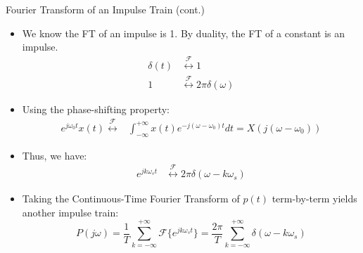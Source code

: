 \begin{frame}{Fourier Transform of an Impulse Train (cont.)}
  \vspace{-0.2cm}
  \begin{itemize}
      [bullet]

    \item We know the FT of an impulse is 1. By duality, the FT of a constant is an impulse.
      \begin{align*}
        \delta(t) & \stackrel{\mathcal{F}}{\longleftrightarrow} 1                  \\
        1         & \stackrel{\mathcal{F}}{\longleftrightarrow} 2\pi\delta(\omega)
      \end{align*}

    \item Using the phase-shifting property:
      \begin{align*}
        e^{j\omega_0 t} x(t)  \stackrel{\mathcal{F}}{\longleftrightarrow}
        & \int_{-\infty}^{+\infty} x(t) e^{-j(\omega - \omega_0)t} dt = X(j(\omega - \omega_0))
      \end{align*}
    \item Thus, we have:
      \begin{align*}
        e^{jk\omega_s t} & \stackrel{\mathcal{F}}{\longleftrightarrow} 2\pi\delta(\omega - k\omega_s)
      \end{align*}
    \item Taking the Continuous-Time Fourier Transform of $p(t)$ term-by-term yields another impulse train:
      \begin{equation*}
        P(j\omega) =  \frac{1}{T} \sum_{k=-\infty}^{+\infty} \mathcal{F}\{e^{jk\omega_s t}\} = \frac{2\pi}{T} \sum_{k=-\infty}^{+\infty} \delta(\omega - k\omega_s)
      \end{equation*}
  \end{itemize}
\end{frame}

